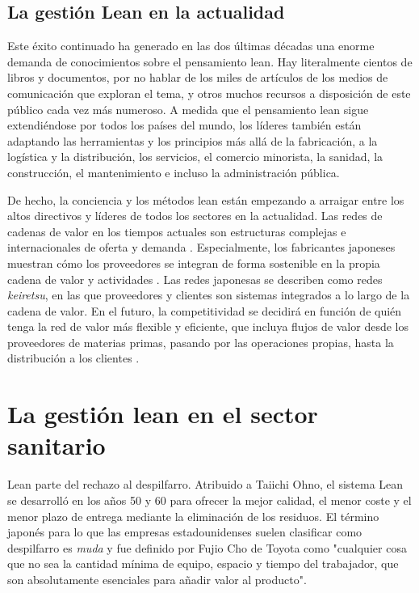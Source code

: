 \subsection{La gestión Lean en la actualidad}

Este éxito continuado ha generado en las dos últimas décadas una enorme demanda de conocimientos sobre el pensamiento lean.
Hay literalmente cientos de libros y documentos, por no hablar de los miles de artículos de los medios de comunicación que exploran el tema, y otros muchos recursos a disposición de este público cada vez más numeroso.
A medida que el pensamiento lean sigue extendiéndose por todos los países del mundo, los líderes también están adaptando las herramientas y los principios más allá de la fabricación, a la logística y la distribución, los servicios, el comercio minorista, la sanidad, la construcción, el mantenimiento e incluso la administración pública.

De hecho, la conciencia y los métodos lean están empezando a arraigar entre los altos directivos y líderes de todos los sectores en la actualidad.
Las redes de cadenas de valor en los tiempos actuales son estructuras complejas e internacionales de oferta y demanda \cite{helmold_global_2016}.
Especialmente, los fabricantes japoneses muestran cómo los proveedores se integran de forma sostenible en la propia cadena de valor y actividades \cite{lincoln_keiretsu_1992}.
Las redes japonesas se describen como redes \textit{keiretsu}, en las que proveedores y clientes son sistemas integrados a lo largo de la cadena de valor.
En el futuro, la competitividad se decidirá en función de quién tenga la red de valor más flexible y eficiente, que incluya flujos de valor desde los proveedores de materias primas, pasando por las operaciones propias, hasta la distribución a los clientes \cite{singh_srai_supply_2008}.

\section{La gestión lean en el sector sanitario}

Lean parte del rechazo al despilfarro. Atribuido a Taiichi Ohno, el sistema Lean se desarrolló en los años 50 y 60 para ofrecer la mejor calidad, el menor coste y el menor plazo de entrega mediante la eliminación de los residuos.
El término japonés para lo que las empresas estadounidenses suelen clasificar como despilfarro es \textit{muda} y fue definido por Fujio Cho de Toyota como "cualquier cosa que no sea la cantidad mínima de equipo, espacio y tiempo del trabajador, que son absolutamente esenciales para añadir valor al producto".

